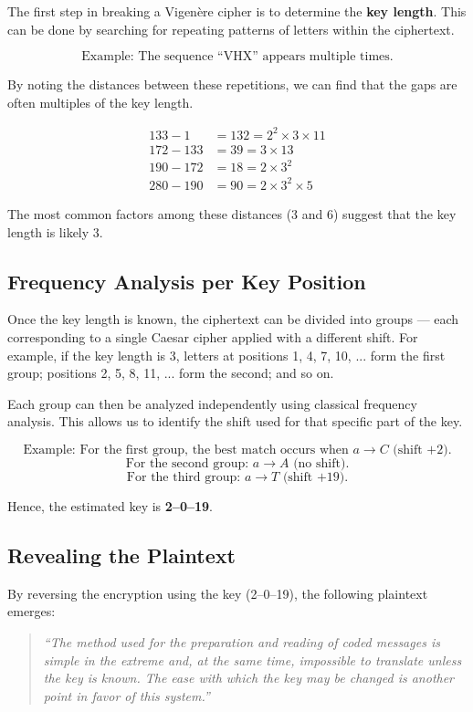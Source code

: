 The first step in breaking a Vigenère cipher is to determine the \textbf{key length}.  
This can be done by searching for repeating patterns of letters within the ciphertext.

\[
\text{Example: The sequence “VHX” appears multiple times.}
\]

By noting the distances between these repetitions, we can find that the gaps are often multiples of the key length.

\[
\begin{aligned}
133 - 1 &= 132 = 2^2 \times 3 \times 11 \\
172 - 133 &= 39 = 3 \times 13 \\
190 - 172 &= 18 = 2 \times 3^2 \\
280 - 190 &= 90 = 2 \times 3^2 \times 5
\end{aligned}
\]

The most common factors among these distances (3 and 6) suggest that the key length is likely 3.

\subsection{Frequency Analysis per Key Position}

Once the key length is known, the ciphertext can be divided into groups — each corresponding to a single Caesar cipher applied with a different shift.  
For example, if the key length is 3, letters at positions 1, 4, 7, 10, ... form the first group; positions 2, 5, 8, 11, ... form the second; and so on.

Each group can then be analyzed independently using classical frequency analysis.  
This allows us to identify the shift used for that specific part of the key.

\[
\text{Example: For the first group, the best match occurs when } a \rightarrow C \text{ (shift +2).}
\]
\[
\text{For the second group: } a \rightarrow A \text{ (no shift).}
\]
\[
\text{For the third group: } a \rightarrow T \text{ (shift +19).}
\]

Hence, the estimated key is \textbf{2–0–19}.

\subsection{Revealing the Plaintext}

By reversing the encryption using the key (2–0–19), the following plaintext emerges:

\begin{quote}
\textit{“The method used for the preparation and reading of coded messages is simple in the extreme and, at the same time, impossible to translate unless the key is known. The ease with which the key may be changed is another point in favor of this system.”}
\end{quote}

